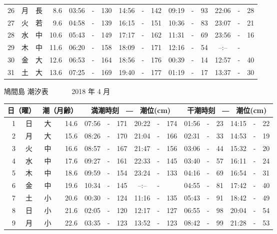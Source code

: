 \documentclass[12pt.a4j]{jsarticle}
\begin{document}
\begin{center}
\begin{table}[ht]
\begin{tabular}{|rc|cr|ccrccr|ccrccr|}
26 & 月 & 長 &  8.6 &  03:56 &-& 130  &  14:56 &-& 142  &   09:19 &-&  93  &   22:06 &-&  28  \\
27 & 火 & 若 &  9.6 &  04:58 &-& 139  &  16:15 &-& 151  &   10:36 &-&  83  &   23:07 &-&  21  \\
28 & 水 & 中 & 10.6 &  05:43 &-& 149  &  17:17 &-& 162  &   11:31 &-&  69  &   23:56 &-&  16  \\
29 & 木 & 中 & 11.6 &  06:20 &-& 158  &  18:09 &-& 171  &   12:16 &-&  54  &   --:-- &-&     \\
30 & 金 & 大 & 12.6 &  06:53 &-& 164  &  18:56 &-& 176  &   00:39 &-&  14  &   12:57 &-&  40  \\
31 & 土 & 大 & 13.6 &  07:25 &-& 169  &  19:40 &-& 177  &   01:19 &-&  17  &   13:37 &-&  30  \\
   \hline
   \end{tabular}
\end{table}
\newpage
 {\LARGE 鳩間島  潮汐表　　　}
 {\large 2018 年  4 月}\\
 \begin{table}[ht]
    \begin{tabular}{|rc|cr|ccrccr|ccrccr|}
    \hline
    \multicolumn{2}{|c|}{日（曜）} & \multicolumn{2}{c|}{潮（月齢）} & \multicolumn{6}{c|}{満潮時刻　―　潮位(cm)} & \multicolumn{6}{c|}{干潮時刻　―　潮位(cm)} \\
 \hline
 1 & 日 & 大 & 14.6 &  07:56 &-& 171  &  20:22 &-& 174  &   01:56 &-&  23  &   14:15 &-&  22  \\
 2 & 月 & 大 & 15.6 &  08:26 &-& 170  &  21:04 &-& 166  &   02:31 &-&  33  &   14:53 &-&  19  \\
 3 & 火 & 中 & 16.6 &  08:57 &-& 167  &  21:47 &-& 156  &   03:06 &-&  44  &   15:32 &-&  20  \\
 4 & 水 & 中 & 17.6 &  09:27 &-& 161  &  22:33 &-& 145  &   03:40 &-&  57  &   16:11 &-&  24  \\
 5 & 木 & 中 & 18.6 &  09:59 &-& 154  &  23:24 &-& 133  &   04:16 &-&  69  &   16:54 &-&  31  \\
 6 & 金 & 中 & 19.6 &  10:34 &-& 145  &  --:-- &-&     &   04:55 &-&  81  &   17:42 &-&  40  \\
 7 & 土 & 小 & 20.6 &  00:30 &-& 124  &  11:16 &-& 135  &   05:43 &-&  91  &   18:42 &-&  49  \\
 8 & 日 & 小 & 21.6 &  02:05 &-& 120  &  12:17 &-& 127  &   06:55 &-&  98  &   20:04 &-&  54  \\
 9 & 月 & 小 & 22.6 &  03:35 &-& 123  &  13:52 &-& 123  &   08:42 &-&  99  &   21:28 &-&  53  \\

\end{tabular}
\end{table}
\end{center}
\end{document}
